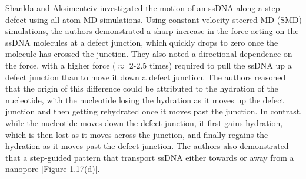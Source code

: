 Shankla and Aksimenteiv investigated the motion of an ssDNA along a step-defect using all-atom MD simulations\supercite{shankla_step-defect_2019}. Using constant velocity-steered MD (SMD) simulations, the authors demonstrated a sharp increase in the force acting on the ssDNA molecules at a defect junction, which quickly drops to zero once the molecule has crossed the junction. They also noted a directional dependence on the force, with a higher force ($\approx$ 2-2.5 times) required to pull the ssDNA up a defect junction than to move it down a defect junction. The authors reasoned that the origin of this difference could be attributed to the hydration of the nucleotide, with the nucleotide losing the hydration as it moves up the defect junction and then getting rehydrated once it moves past the junction. In contrast, while the nucleotide moves down the defect junction, it first gains hydration, which is then lost as it moves across the junction, and finally regains the hydration as it moves past the defect junction. The authors also demonstrated that a step-guided pattern that transport ssDNA either towards or away from a nanopore [Figure 1.17(d)]. 

